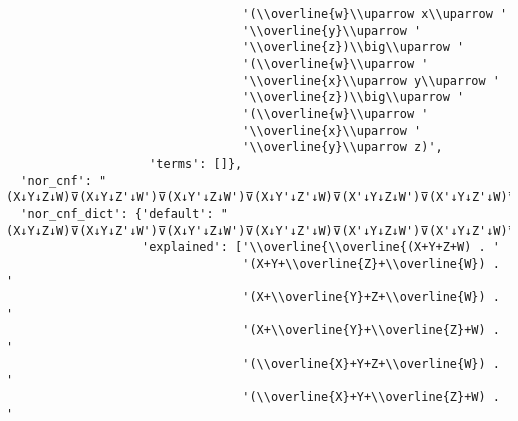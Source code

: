\begin{verbatim}
                                 '(\\overline{w}\\uparrow x\\uparrow '
                                 '\\overline{y}\\uparrow '
                                 '\\overline{z})\\big\\uparrow '
                                 '(\\overline{w}\\uparrow '
                                 '\\overline{x}\\uparrow y\\uparrow '
                                 '\\overline{z})\\big\\uparrow '
                                 '(\\overline{w}\\uparrow '
                                 '\\overline{x}\\uparrow '
                                 '\\overline{y}\\uparrow z)',
                    'terms': []},
  'nor_cnf': "(X↓Y↓Z↓W)⊽(X↓Y↓Z'↓W')⊽(X↓Y'↓Z↓W')⊽(X↓Y'↓Z'↓W)⊽(X'↓Y↓Z↓W')⊽(X'↓Y↓Z'↓W)⊽(X'↓Y'↓Z↓W)⊽(X'↓Y'↓Z'↓W')",
  'nor_cnf_dict': {'default': "(X↓Y↓Z↓W)⊽(X↓Y↓Z'↓W')⊽(X↓Y'↓Z↓W')⊽(X↓Y'↓Z'↓W)⊽(X'↓Y↓Z↓W')⊽(X'↓Y↓Z'↓W)⊽(X'↓Y'↓Z↓W)⊽(X'↓Y'↓Z'↓W')",
                   'explained': ['\\overline{\\overline{(X+Y+Z+W) . '
                                 '(X+Y+\\overline{Z}+\\overline{W}) . '
                                 '(X+\\overline{Y}+Z+\\overline{W}) . '
                                 '(X+\\overline{Y}+\\overline{Z}+W) . '
                                 '(\\overline{X}+Y+Z+\\overline{W}) . '
                                 '(\\overline{X}+Y+\\overline{Z}+W) . '

\end{verbatim}
